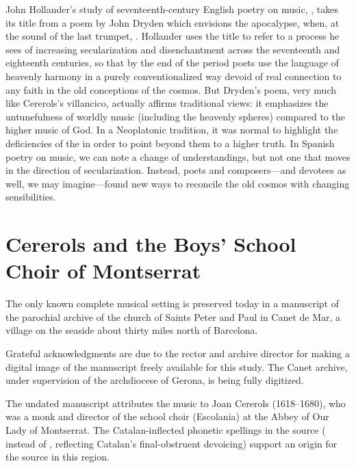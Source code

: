 John Hollander's study of seventeenth-century English poetry on music,
, takes its title from a poem by John Dryden
which envisions the apocalypse, when, at the sound of the last trumpet,
.%
Hollander uses the title to refer to a process he sees of increasing
secularization and disenchantment across the seventeenth and eighteenth
centuries, so that by the end of the period poets use the language of heavenly
harmony in a purely conventionalized way devoid of real connection to any faith
in the old conceptions of the cosmos.
But Dryden's poem, very much like Cererols's villancico, actually affirms
traditional views: it emphasizes the untunefulness of worldly music (including
the heavenly spheres) compared to the higher music of God.
In a Neoplatonic tradition, it was normal to highlight the deficiencies of the
 in order to point beyond them to a higher
truth.
In Spanish poetry on music, we can note a change of understandings, but not one
that moves in the direction of secularization.%
Instead, poets and composers---and devotees as well, we may imagine---found new
ways to reconcile the old cosmos with changing sensibilities.

\section{Cererols and the Boys' School Choir of Montserrat}

The only known complete musical setting is preserved today in a manuscript of
the parochial archive of the church of Saints Peter and Paul in Canet de Mar, a
village on the seaside about thirty miles north of Barcelona.%
\begin{Footnote}
    Grateful acknowledgments are due to the rector and archive director for
    making a digital image of the manuscript freely available for this study.
    The Canet archive, under supervision of the archdiocese of Gerona, is being
    fully digitized.
\end{Footnote}
The undated manuscript attributes the music to Joan Cererols (1618--1680), who
was a monk and director of the school choir (Escolania) at the Abbey of Our Lady
of Montserrat.%
    \citXXX[catalog]
The Catalan-inflected phonetic spellings in the source ( instead
of , reflecting Catalan's final-obstruent devoicing) support an
origin for the source in this region.

